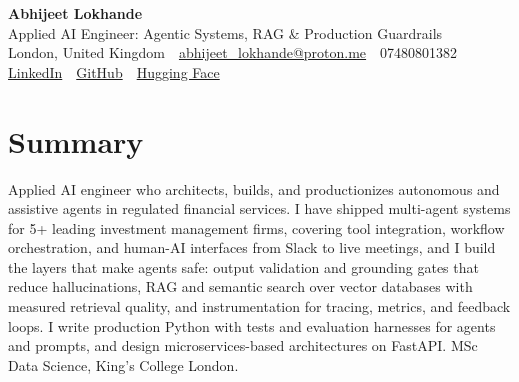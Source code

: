 \documentclass[10pt,a4paper]{article}
\newcommand{\sep}{\,\textcolor{accent!60}{\textbar}\,}
\begin{document}
\begin{center}
  {\fontsize{24}{26}\selectfont\bfseries Abhijeet Lokhande}\\[3pt]
  {\color{accent}\large Applied AI Engineer: Agentic Systems, RAG \& Production Guardrails}\\[5pt]
  {\small
    London, United Kingdom \sep
    \href{mailto:abhijeet_lokhande@proton.me}{abhijeet\_lokhande@proton.me} \sep
    07480801382 \\[2pt]
    \href{https://www.linkedin.com/in/ablds/}{LinkedIn} \sep
    \href{https://github.com/abhijeetscode}{GitHub} \sep
    \href{https://huggingface.co/ab-ai}{Hugging Face}
  }
\end{center}
\vspace{2pt}

\section{Summary}
Applied AI engineer who architects, builds, and productionizes autonomous and assistive agents in regulated financial services. I have shipped multi-agent systems for 5+ leading investment management firms, covering tool integration, workflow orchestration, and human-AI interfaces from Slack to live meetings, and I build the layers that make agents safe: output validation and grounding gates that reduce hallucinations, RAG and semantic search over vector databases with measured retrieval quality, and instrumentation for tracing, metrics, and feedback loops. I write production Python with tests and evaluation harnesses for agents and prompts, and design microservices-based architectures on FastAPI. MSc Data Science, King's College London.

\end{document}
